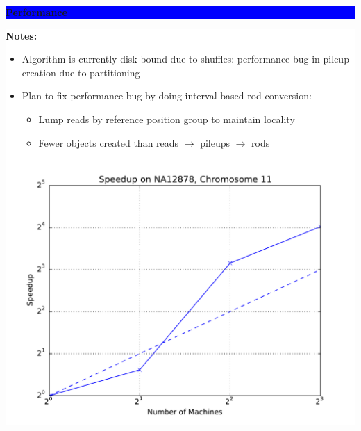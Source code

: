 \documentclass[11pt]{a0poster}
\begin{document}
{\begin{minipage}[t][2045pt][t]{\linewidth}
\begin{minipage}{0.6\linewidth}
\vspace{70pt}
\colorbox{Blue}{
\begin{minipage}[t]{\linewidth}
\vspace{30pt}
\begin{center}
\Huge \bf \color{White} Performance
\end{center}
\vspace{17pt}
\end{minipage}
}
\colorbox{White}{
\begin{minipage}[t][500pt][t]{\linewidth}
\begin{minipage}{0.3\linewidth}
\LARGE
\color{Blue}
\textbf{Notes:}
\begin{itemize}
\item Algorithm is currently disk bound due to shuffles:
performance bug in pileup creation due to partitioning
\item Plan to fix performance bug by doing interval-based rod conversion: 
\Large
\begin{itemize}
\item Lump reads by reference position group to maintain locality
\item Fewer objects created than reads $\to$ pileups $\to$ rods
\end{itemize}
\end{itemize}
\end{minipage}
\begin{minipage}{0.03\linewidth}
\hfill
\pagebreak
\end{minipage}
\begin{minipage}{0.3\linewidth}
\includegraphics[width=\linewidth]{speedup_na12878_chr11.pdf}

\end{minipage}
\end{minipage}}
\end{minipage}
\end{minipage}}
\end{document}
